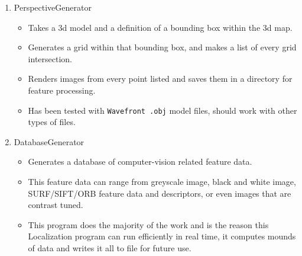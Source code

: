 \documentclass[a4paper,11pt]{article}
\begin{document}
        \begin{enumerate}
        \item PerspectiveGenerator
            \begin{itemize}
            \item Takes a 3d model and a definition of a bounding box within the 3d map.
            \item Generates a grid within that bounding box, and makes a list of every grid intersection.
            \item Renders images from every point listed and saves them in a directory for feature processing. 
            \item Has been tested with \texttt{Wavefront .obj} model files, should work with other types of files.
            \end{itemize}
        \item DatabaseGenerator
            \begin{itemize}
            \item Generates a database of computer-vision related feature data.
            \item This feature data can range from greyscale image, black and white image, SURF/SIFT/ORB feature data and descriptors, or even images that are contrast tuned.
            \item This program does the majority of the work and is the reason this Localization program can run efficiently in real time, it computes mounds of data and writes it all to file for future use.
            \end{itemize}
        \end{enumerate}
  
\end{document}
